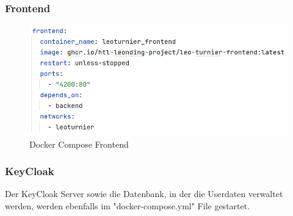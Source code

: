 \subsubsection{Frontend}

\begin{figure}[H]
    \includegraphics[scale=0.4]{pics/docker/docker-compose_frontend.png}
    \caption{Docker Compose Frontend}
\end{figure}

\subsubsection{KeyCloak}

Der KeyCloak Server sowie die Datenbank, in der die Userdaten verwaltet werden, werden ebenfalls im "docker-compose.yml" File gestartet.

